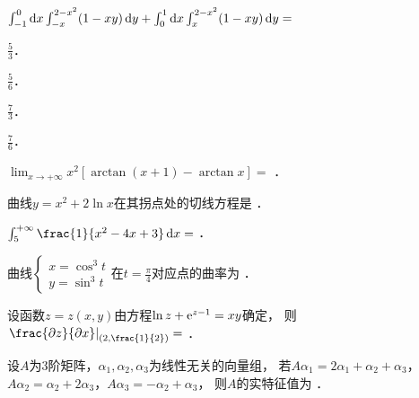 \documentclass[plain,noanswer,medmath]{../../template/jnuexam}
\begin{document}


\begin{problem}
$\int_{-1}^0\mathop{}\!\mathrm{d} x \int_{-x}^{2 - x^2}(1 - xy)\mathop{}\!\mathrm{d} y + \int_0^1\mathop{}\!\mathrm{d} x \int_x^{2 - x^2}(1 - xy)\mathop{}\!\mathrm{d} y =$\pickout{}
\begin{abcd}
\item $\frac{5}{3}$．
\item $\frac{5}{6}$．
\item $\frac{7}{3}$．
\item $\frac{7}{6}$．
\end{abcd}
\end{problem}








\begin{problem}
$\lim_{x \to +\infty} x^2[\arctan(x + 1) - \arctan x] =$ \fillin{}．
\end{problem}


\begin{problem}
曲线$y = x^2 + 2\ln x$在其拐点处的切线方程是 \fillin{}．
\end{problem}


\begin{problem}
$\int_5^{+\infty} \frac{1}{x^2 - 4x + 3}\dx =$ \fillin{}．
\end{problem}


\begin{problem}
曲线$\begin{cases}
  x = \cos^3 t \\
  y = \sin^3 t
\end{cases}$在$t = \frac{\pi}{4}$对应点的曲率为 \fillin{}．
\end{problem}


\begin{problem}
设函数$z = z(x,y)$由方程$\ln z + \mathrm{e}^{z - 1} = xy$确定，
则$\left.\frac{\pdz}{\pdx}\right|_{\left(2,\frac{1}{2}\right)} =$ \fillin{}．
\end{problem}


\begin{problem}
设$A$为$3$阶矩阵，$\alpha_1,\alpha_2,\alpha_3$为线性无关的向量组，
若$A\alpha_1 = 2\alpha_1 + \alpha_2 + \alpha_3$，
$A\alpha_2 = \alpha_2 + 2\alpha_3$，$A\alpha_3 = - \alpha_2 + \alpha_3$，
则$A$的实特征值为 \fillin{}．
\end{problem}
\end{document}

